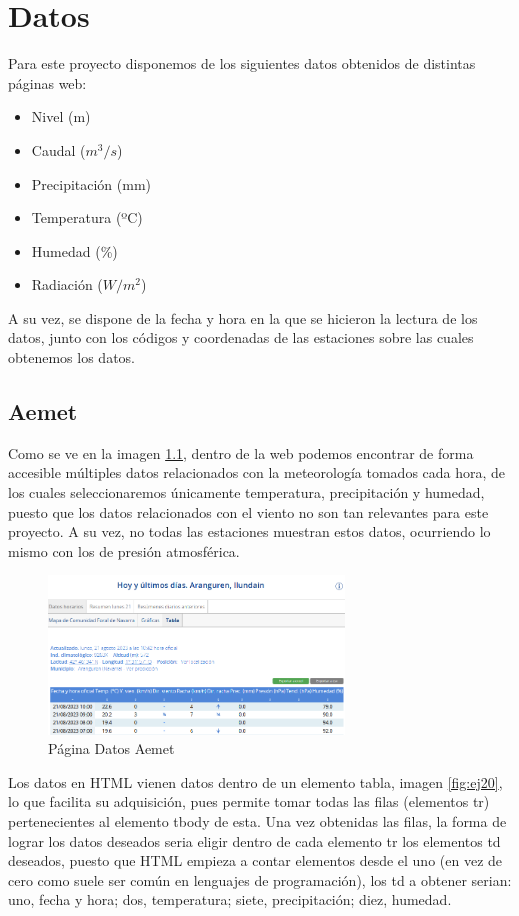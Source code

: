\chapter[Datos]{Datos}
\label{Chap2}

Para este proyecto disponemos de los siguientes datos obtenidos de distintas páginas web:
\begin{itemize}
	\item Nivel (m)
	\item Caudal ($m^3/s$)
	\item Precipitación (mm)
	\item Temperatura (ºC)
	\item Humedad (\%)
	\item Radiación ($W/m^2$)
\end{itemize}
A su vez, se dispone de la fecha y hora en la que se hicieron la lectura de los datos, junto con los códigos y coordenadas de las estaciones sobre las cuales obtenemos los datos.

\section{Aemet}
Como se ve en la imagen \ref{fig:ej3}, dentro de la web podemos encontrar de forma accesible múltiples datos relacionados con la meteorología tomados cada hora, de los cuales seleccionaremos únicamente temperatura, precipitación y humedad, puesto que los datos relacionados con el viento no son tan relevantes para este proyecto. A su vez, no todas las estaciones muestran estos datos, ocurriendo lo mismo con los de presión atmosférica.

\begin{figure} [H]
	\centering
	\includegraphics[width=0.7\textwidth]{fig/AemetData.png}
	\caption[Página Aemet de la estación en Aranguren (Navarra)]{Página Datos Aemet}
	\label{fig:ej3}
\end{figure}

Los datos en HTML vienen datos dentro de un elemento tabla, imagen \ref{fig:ej20}, lo que facilita su adquisición, pues permite tomar todas las filas (elementos tr) pertenecientes al elemento tbody de esta. Una vez obtenidas las filas, la forma de lograr los datos deseados seria eligir dentro de cada elemento tr los elementos td deseados, puesto que HTML empieza a contar elementos desde el uno (en vez de cero como suele ser común en lenguajes de programación), los td a obtener serian: uno, fecha y hora; dos, temperatura; siete, precipitación; diez, humedad.


